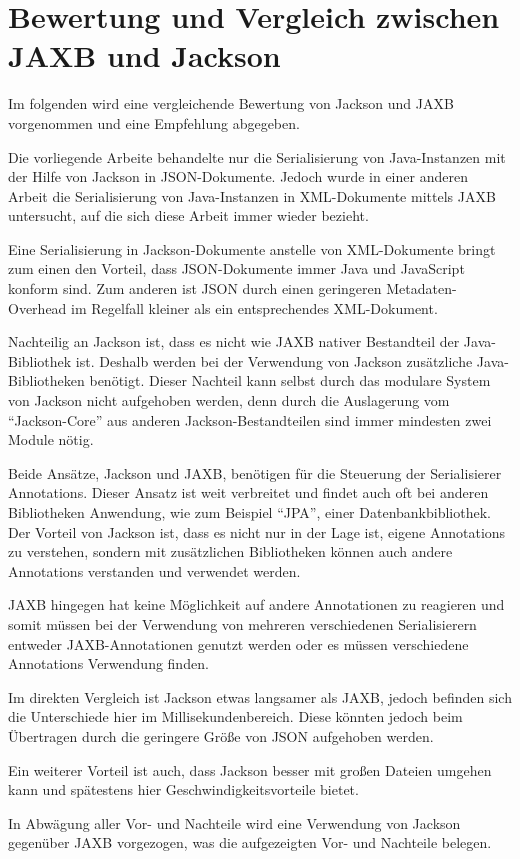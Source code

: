 \section{Bewertung und Vergleich zwischen JAXB und Jackson}
Im folgenden wird eine vergleichende Bewertung von Jackson und JAXB vorgenommen und eine Empfehlung abgegeben.

Die vorliegende Arbeite behandelte nur die Serialisierung von Java-Instanzen mit der Hilfe von Jackson in \ac{JSON}-Dokumente. Jedoch wurde in einer anderen Arbeit die Serialisierung von Java-Instanzen in XML-Dokumente mittels \ac{JAXB} untersucht, auf die sich diese Arbeit immer wieder bezieht.\cite{Wal14}

Eine Serialisierung in Jackson-Dokumente anstelle von XML-Dokumente bringt zum einen den Vorteil, dass \ac{JSON}-Dokumente immer Java und JavaScript konform sind. Zum anderen ist \ac{JSON} durch einen geringeren Metadaten-Overhead im Regelfall kleiner als ein entsprechendes XML-Dokument. 

Nachteilig an Jackson ist, dass es nicht wie JAXB nativer Bestandteil der Java-Bibliothek ist. Deshalb werden bei der Verwendung von Jackson zus\"atzliche Java-Bibliotheken ben\"otigt. Dieser Nachteil kann selbst durch das modulare System von Jackson nicht aufgehoben werden, denn durch die Auslagerung vom "`Jackson-Core"' aus anderen Jackson-Bestandteilen sind immer mindesten zwei Module n\"otig. 

Beide Ans\"atze, Jackson und \ac{JAXB}, ben\"otigen f\"ur die Steuerung der Serialisierer Annotations. Dieser Ansatz ist weit verbreitet und findet auch oft bei anderen Bibliotheken Anwendung, wie zum Beispiel "`JPA"', einer Datenbankbibliothek. Der Vorteil von Jackson ist, dass es nicht nur in der Lage ist, eigene Annotations zu verstehen, sondern mit zus\"atzlichen Bibliotheken k\"onnen auch andere Annotations verstanden und verwendet werden. 

JAXB hingegen hat keine M\"oglichkeit auf andere Annotationen zu reagieren und somit m\"ussen bei der Verwendung von mehreren verschiedenen Serialisierern entweder JAXB-Annotationen genutzt werden oder es m\"ussen verschiedene Annotations Verwendung finden.

Im direkten Vergleich ist Jackson etwas langsamer als JAXB, jedoch befinden sich die Unterschiede hier im Millisekundenbereich. Diese k\"onnten jedoch beim \"Ubertragen durch die geringere Gr\"o\ss{}e von \ac{JSON} aufgehoben werden.

Ein weiterer Vorteil ist auch, dass Jackson besser mit gro\ss{}en Dateien umgehen kann und sp\"atestens hier Geschwindigkeitsvorteile bietet.

In Abw\"agung aller Vor- und Nachteile wird eine Verwendung von Jackson gegen\"uber JAXB vorgezogen, was die aufgezeigten Vor- und Nachteile belegen.
